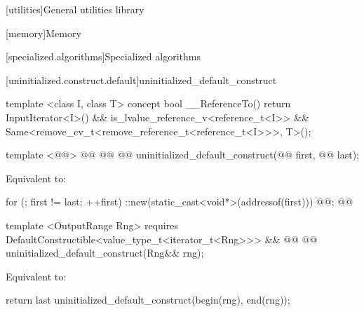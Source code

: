 \setcounter{chapter}{19}
[utilities]{General utilities library}

\setcounter{section}{6}
[memory]{Memory}

\setcounter{subsection}{11}
[specialized.algorithms]{Specialized algorithms}

[uninitialized.construct.default]{uninitialized_default_construct}
\begin{codeblock}
namespace std { @@
\end{codeblock}

{\color{newclr}
\begin{codeblock}
template <class I, class T>
concept bool __ReferenceTo() {
  return InputIterator<I>() &&
    is_lvalue_reference_v<reference_t<I>> &&
    Same<remove_cv_t<remove_reference_t<reference_t<I>>>, T>();
}
\end{codeblock}
} %

\begin{codeblock}
  template <@@>
    @@
             @@
    @@ uninitialized_default_construct(@@ first, @@ last);
\end{codeblock}

\setcounter{Paras}{0}
\pnum
\effects Equivalent to:
\begin{codeblock}
        for (; first != last; ++first)
          ::new(static_cast<void*>(addressof(\newtxt{*}first)))
            @@;
        @@
\end{codeblock}

{\color{addclr}
\begin{codeblock}
  template <OutputRange Rng>
    requires DefaultConstructible<value_type_t<iterator_t<Rng>>>\newtxt{()} &&
             @@
  @@ uninitialized_default_construct(Rng&& rng);
\end{codeblock}

\pnum
\effects Equivalent to:
\begin{codeblock}
        return last uninitialized_default_construct(begin(rng), end(rng));
\end{codeblock}
} %

